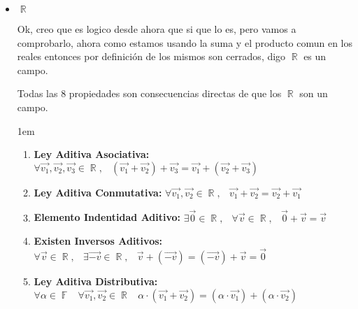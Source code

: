 \documentclass[12pt, fleqn]{article}                             %
\newenvironment{SmallIndentation}[1][0.75em]                    %
        {\begin{adjustwidth}{#1}{}\begin{footnotesize}}             %
        {\end{footnotesize}\end{adjustwidth}}                       %
\DeclareMathOperator \Space {\quad}                             %
\DeclareMathOperator \MiniSpace {\;}                            %
\theoremstyle{break}                                            %
\DeclareMathOperator \Reals        {\mathbb{R}}                 %
\DeclareMathOperator \GenericField {\mathbb{F}}                 %
\begin{document}
    \begin{itemize}

        \item
            $\Reals$

            Ok, creo que es logico desde ahora que si que lo es, pero vamos a comprobarlo, 
            ahora como estamos usando la suma y el producto comun en los reales entonces
            por definición de los mismos son cerrados, digo $\Reals$ es un campo.

            Todas las $8$ propiedades son consecuencias directas de que los $\Reals$
            son un campo.

            \begin{SmallIndentation}[1em]

                \begin{enumerate}
                
                    \item 
                        \textbf{Ley Aditiva Asociativa:}
                        $\forall \vec{v_1}, \vec{v_2}, \vec{v_3} \in \Reals, \MiniSpace
                            (\vec{v_1} + \vec{v_2}) + \vec{v_3} = \vec{v_1} + (\vec{v_2} + \vec{v_3})$

                    \item 
                        \textbf{Ley Aditiva Conmutativa:}
                        $\forall \vec{v_1}, \vec{v_2} \in \Reals, \MiniSpace
                                \vec{v_1} + \vec{v_2} = \vec{v_2} + \vec{v_1}$

                    \item 
                        \textbf{Elemento Indentidad Aditivo:}
                        $\exists \vec{0} \in \Reals, \MiniSpace
                            \forall \vec{v} \in \Reals, \MiniSpace \vec{0} + \vec{v} = \vec{v}$

                    \item 
                        \textbf{Existen Inversos Aditivos:}
                        $\forall \vec{v} \in \Reals, \MiniSpace
                                \exists \vec{-v} \in \Reals, \MiniSpace
                                    \vec{v} + (\vec{-v}) = (\vec{-v}) + \vec{v} = \vec{0}$

                    \item 
                        \textbf{Ley Aditiva Distributiva:}
                        $\forall \alpha \in \GenericField \MiniSpace
                            \forall \vec{v_1}, \vec{v_2} \in \Reals \MiniSpace
                                \alpha \cdot (\vec{v_1} + \vec{v_2}) = 
                                    (\alpha \cdot \vec{v_1}) + (\alpha \cdot \vec{v_2})$


\end{enumerate}
\end{SmallIndentation}
\end{itemize}
\end{document}
